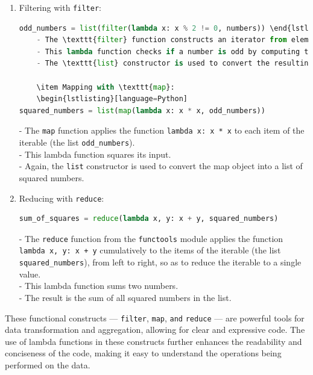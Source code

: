 \documentclass[a4paper]{article}
\begin{document}
\begin{enumerate}
    \item Filtering with \texttt{filter}:
    \begin{lstlisting}[language=Python]
odd_numbers = list(filter(lambda x: x % 2 != 0, numbers)) \end{lstlisting}
    - The \texttt{filter} function constructs an iterator from elements of the iterable (in this case, the list \texttt{numbers}) for which the function \texttt{lambda x: x \% 2 != 0} returns \texttt{True}.\\
    - This lambda function checks if a number is odd by computing the remainder of the division by 2.\\
    - The \texttt{list} constructor is used to convert the resulting iterator back into a list, containing only the odd numbers.\\

    \item Mapping with \texttt{map}:
    \begin{lstlisting}[language=Python]
squared_numbers = list(map(lambda x: x * x, odd_numbers)) \end{lstlisting}
    - The \texttt{map} function applies the function \texttt{lambda x: x * x} to each item of the iterable (the list \texttt{odd\_numbers}).\\
    - This lambda function squares its input.\\
    - Again, the \texttt{list} constructor is used to convert the map object into a list of squared numbers.\\

    \item Reducing with \texttt{reduce}:
    \begin{lstlisting}[language=Python]
sum_of_squares = reduce(lambda x, y: x + y, squared_numbers) \end{lstlisting}
    - The \texttt{reduce} function from the \texttt{functools} module applies the function \texttt{lambda x, y: x + y} cumulatively to the items of the iterable (the list \texttt{squared\_numbers}), from left to right, so as to reduce the iterable to a single value.\\
    - This lambda function sums two numbers.\\
    - The result is the sum of all squared numbers in the list.\\
\end{enumerate}


These functional constructs — \texttt{filter}, \texttt{map}, \texttt{and} \texttt{reduce} — are powerful tools for data transformation and aggregation, allowing for clear and expressive code. The use of lambda functions in these constructs further enhances the readability and conciseness of the code, making it easy to understand the operations being performed on the data.
\end{document}
